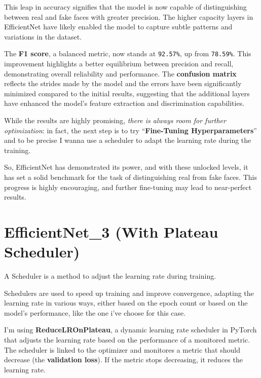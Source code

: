 \documentclass[12pt]{article}
\begin{document}
This leap in accuracy signifies that the model is now capable of
distinguishing between real and fake faces with greater precision. The
higher capacity layers in EfficientNet have likely enabled the model to
capture subtle patterns and variations in the dataset.

The \textbf{F1 score}, a balanced metric, now stands at
\texttt{92.57\%}, up from \texttt{78.59\%}. This improvement highlights
a better equilibrium between precision and recall, demonstrating overall
reliability and performance. The \textbf{confusion matrix} reflects the
strides made by the model and the errors have been significantly
minimized compared to the initial results, suggesting that the
additional layers have enhanced the model's feature extraction and
discrimination capabilities.

While the results are highly promising, \emph{there is always room for
further optimization}: in fact, the next step is to try
``\textbf{Fine-Tuning Hyperparameters}'' and to be precise I wanna use a
scheduler to adapt the learning rate during the training.

So, EfficientNet has demonstrated its power, and with these unlocked
levels, it has set a solid benchmark for the task of distinguishing real
from fake faces. This progress is highly encouraging, and further
fine-tuning may lead to near-perfect results.

    \section{EfficientNet\_3 (With Plateau
Scheduler)}\label{efficientnet_3-with-plateau-scheduler}

    A Scheduler is a method to adjust the learning rate during training.

Schedulers are used to speed up training and improve convergence,
adapting the learning rate in various ways, either based on the epoch
count or based on the model's performance, like the one i've choose for
this case.

I'm using \textbf{ReduceLROnPlateau}, a dynamic learning rate scheduler
in PyTorch that adjusts the learning rate based on the performance of a
monitored metric. The scheduler is linked to the optimizer and monitores
a metric that should decrease (the \textbf{validation loss}). If the
metric stops decreasing, it reduces the learning rate.
\end{document}

